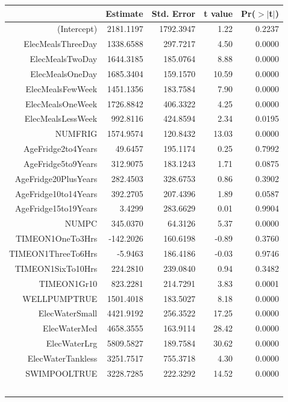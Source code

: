 \documentclass{article}
\begin{document}
\begin{longtable}{rrrrr}
  \hline
 & Estimate & Std. Error & t value & Pr($>$$|$t$|$) \\ 
  \hline
(Intercept) & 2181.1197 & 1792.3947 & 1.22 & 0.2237 \\ 
  ElecMealsThreeDay & 1338.6588 & 297.7217 & 4.50 & 0.0000 \\ 
  ElecMealsTwoDay & 1644.3185 & 185.0764 & 8.88 & 0.0000 \\ 
  ElecMealsOneDay & 1685.3404 & 159.1570 & 10.59 & 0.0000 \\ 
  ElecMealsFewWeek & 1451.1356 & 183.7584 & 7.90 & 0.0000 \\ 
  ElecMealsOneWeek & 1726.8842 & 406.3322 & 4.25 & 0.0000 \\ 
  ElecMealsLessWeek & 992.8116 & 424.8594 & 2.34 & 0.0195 \\ 
  NUMFRIG & 1574.9574 & 120.8432 & 13.03 & 0.0000 \\ 
  AgeFridge2to4Years & 49.6457 & 195.1174 & 0.25 & 0.7992 \\ 
  AgeFridge5to9Years & 312.9075 & 183.1243 & 1.71 & 0.0875 \\ 
  AgeFridge20PlusYears & 282.4503 & 328.6753 & 0.86 & 0.3902 \\ 
  AgeFridge10to14Years & 392.2705 & 207.4396 & 1.89 & 0.0587 \\ 
  AgeFridge15to19Years & 3.4299 & 283.6629 & 0.01 & 0.9904 \\ 
  NUMPC & 345.0370 & 64.3126 & 5.37 & 0.0000 \\ 
  TIMEON1OneTo3Hrs & -142.2026 & 160.6198 & -0.89 & 0.3760 \\ 
  TIMEON1ThreeTo6Hrs & -5.9463 & 186.4186 & -0.03 & 0.9746 \\ 
  TIMEON1SixTo10Hrs & 224.2810 & 239.0840 & 0.94 & 0.3482 \\ 
  TIMEON1Gr10 & 823.2281 & 214.7291 & 3.83 & 0.0001 \\ 
  WELLPUMPTRUE & 1501.4018 & 183.5027 & 8.18 & 0.0000 \\ 
  ElecWaterSmall & 4421.9192 & 256.3522 & 17.25 & 0.0000 \\ 
  ElecWaterMed & 4658.3555 & 163.9114 & 28.42 & 0.0000 \\ 
  ElecWaterLrg & 5809.5827 & 189.7584 & 30.62 & 0.0000 \\ 
  ElecWaterTankless & 3251.7517 & 755.3718 & 4.30 & 0.0000 \\ 
  SWIMPOOLTRUE & 3228.7285 & 222.3292 & 14.52 & 0.0000 \\ 
$$
\end{longtable}
\end{document}
